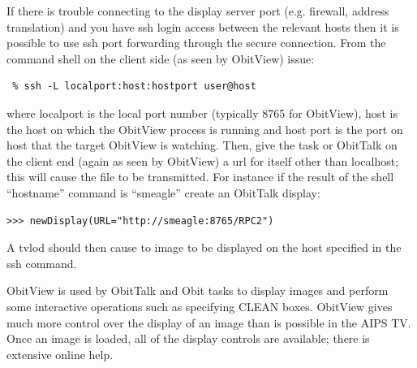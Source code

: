 \documentclass[11pt]{report}
\begin{document}
If there is trouble connecting to the display server port
(e.g. firewall, address translation) and you have ssh login access
between the relevant hosts then it is possible to use ssh port
forwarding through the secure connection.
From the command shell on the client side (as seen by ObitView)
issue:
\begin{verbatim}
 % ssh -L localport:host:hostport user@host
\end{verbatim}
where localport is the local port number (typically 8765 for
ObitView), host is the host on which the ObitView process is running
and host port is the port on host that the target ObitView is
watching.
Then, give the task or ObitTalk on the client end (again as seen by
ObitView) a url for itself other than localhost; this will cause the
file to be transmitted.
For instance if the result of the shell ``hostname'' command is
``smeagle'' create an ObitTalk display:
\begin{verbatim}
>>> newDisplay(URL="http://smeagle:8765/RPC2")
\end{verbatim}
A tvlod should then cause to image to be displayed on the host
specified in the ssh command.

ObitView is used by ObitTalk and Obit tasks to display images and
perform some interactive operations such as specifying CLEAN boxes.
ObitView gives much more control over the display of an image than is
possible in the AIPS TV.
Once an image is loaded, all of the display controls are available;
there is extensive online help.
\end{document}
